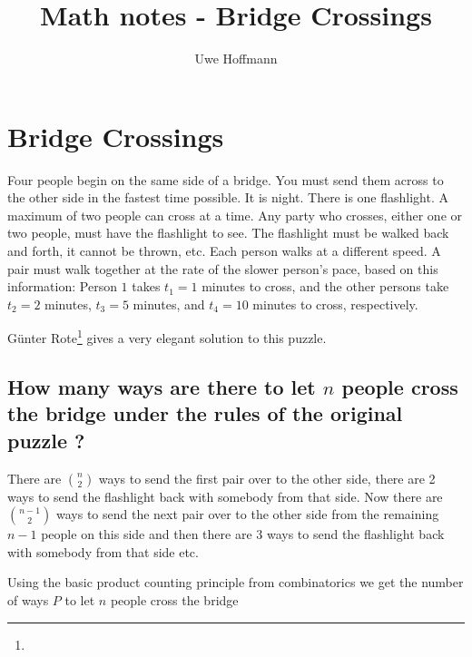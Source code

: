 

\title{Math notes - Bridge Crossings}
\author{Uwe Hoffmann}



\setcounter{chapter}{1}
\section*{Bridge Crossings}

\begin{fullwidth}

\vspace{10 mm}
\begin{problem}
Four people begin on the same side of a bridge. You must send them across to the other side in the fastest time possible. It is night. There is one flashlight. A maximum of two people can cross at a time. Any party who crosses, either one or two people, must have the flashlight to see. The flashlight must be walked back and forth, it cannot be thrown, etc. Each person walks at a different speed. A pair must walk together at the rate of the slower person's pace, based on this information: Person $1$ takes $t_1 = 1$ minutes to cross, and the other persons take $t_2 = 2$ minutes, $t_3 = 5$ minutes, and $t_4 = 10$ minutes to cross, respectively. 
\end{problem}

\end{fullwidth}

G\"unter Rote\footnote{} gives a very elegant solution to this puzzle.

\subsection{How many ways are there to let $n$ people cross the bridge under the rules of the original puzzle ?}

There are $\binom{n}{2}$ ways to send the first pair over to the other side, there are 2 ways to send the flashlight back with somebody from that side.  Now there are $\binom{n -1}{2}$ ways to send the next pair over to the other side from the remaining $n - 1$ people on this side and then there are 3 ways to send the flashlight back with somebody from that side etc.
 
Using the basic product counting principle from combinatorics we get the number of ways $P$ to let $n$ people cross the bridge

